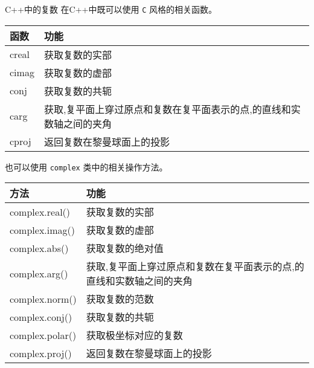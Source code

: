 \documentclass[presentation]{beamer}
\begin{document}
\begin{frame}[fragile,label={sec:org77cb714}]{}
\begin{block}{C++中的复数}
 在C++中既可以使用 \texttt{C} 风格的相关函数。


\begin{center}
\begin{tabular}{ll}
函数 & 功能\\
\hline
creal & 获取复数的实部\\
cimag & 获取复数的虚部\\
conj & 获取复数的共轭\\
carg & 获取,复平面上穿过原点和复数在复平面表示的点,的直线和实数轴之间的夹角\\
cproj & 返回复数在黎曼球面上的投影\\
\end{tabular}
\end{center}

 也可以使用 \texttt{complex} 类中的相关操作方法。


\begin{center}
\begin{tabular}{ll}
方法 & 功能\\
\hline
complex.real() & 获取复数的实部\\
complex.imag() & 获取复数的虚部\\
complex.abs() & 获取复数的绝对值\\
complex.arg() & 获取,复平面上穿过原点和复数在复平面表示的点,的直线和实数轴之间的夹角\\
complex.norm() & 获取复数的范数\\
complex.conj() & 获取复数的共轭\\
complex.polar() & 获取极坐标对应的复数\\
complex.proj() & 返回复数在黎曼球面上的投影\\
\end{tabular}
\end{center}
\end{block}
\end{frame}
\end{document}
